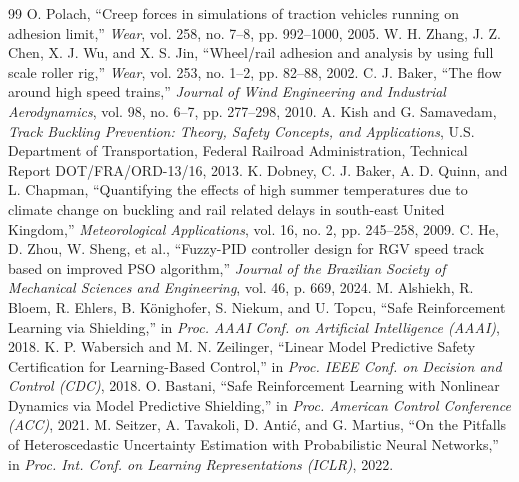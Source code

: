 \documentclass[10pt,a4paper]{article}
\begin{document}
\begin{thebibliography}{99}
 O. Polach, ``Creep forces in simulations of traction vehicles running on adhesion limit,'' \emph{Wear}, vol. 258, no. 7--8, pp. 992--1000, 2005.
 W. H. Zhang, J. Z. Chen, X. J. Wu, and X. S. Jin, ``Wheel/rail adhesion and analysis by using full scale roller rig,'' \emph{Wear}, vol. 253, no. 1--2, pp. 82--88, 2002.
 C. J. Baker, ``The flow around high speed trains,'' \emph{Journal of Wind Engineering and Industrial Aerodynamics}, vol. 98, no. 6--7, pp. 277--298, 2010.
 A. Kish and G. Samavedam, \emph{Track Buckling Prevention: Theory, Safety Concepts, and Applications}, U.S. Department of Transportation, Federal Railroad Administration, Technical Report DOT/FRA/ORD-13/16, 2013.
 K. Dobney, C. J. Baker, A. D. Quinn, and L. Chapman, ``Quantifying the effects of high summer temperatures due to climate change on buckling and rail related delays in south-east United Kingdom,'' \emph{Meteorological Applications}, vol. 16, no. 2, pp. 245--258, 2009.
 C. He, D. Zhou, W. Sheng, et al., ``Fuzzy-PID controller design for RGV speed track based on improved PSO algorithm,'' \emph{Journal of the Brazilian Society of Mechanical Sciences and Engineering}, vol. 46, p. 669, 2024.
 M. Alshiekh, R. Bloem, R. Ehlers, B. K\"onighofer, S. Niekum, and U. Topcu, ``Safe Reinforcement Learning via Shielding,'' in \emph{Proc. AAAI Conf. on Artificial Intelligence (AAAI)}, 2018.
 K. P. Wabersich and M. N. Zeilinger, ``Linear Model Predictive Safety Certification for Learning-Based Control,'' in \emph{Proc. IEEE Conf. on Decision and Control (CDC)}, 2018.
 O. Bastani, ``Safe Reinforcement Learning with Nonlinear Dynamics via Model Predictive Shielding,'' in \emph{Proc. American Control Conference (ACC)}, 2021.
 M. Seitzer, A. Tavakoli, D. Anti\'c, and G. Martius, ``On the Pitfalls of Heteroscedastic Uncertainty Estimation with Probabilistic Neural Networks,'' in \emph{Proc. Int. Conf. on Learning Representations (ICLR)}, 2022.
\end{thebibliography}
\end{document}
